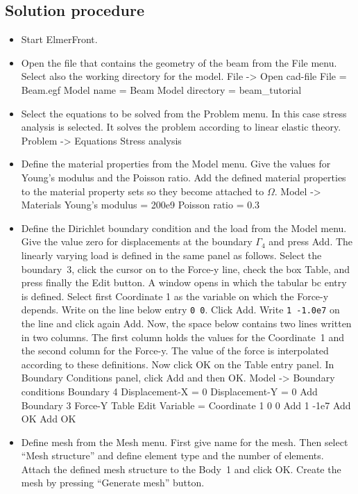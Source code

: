 \subsection*{Solution procedure}

\begin{itemize}
\item Start ElmerFront.
\item Open the file that contains the geometry of the beam from 
the File menu. Select also the working directory for the model.
\ttbegin
File -> Open cad-file 
  File = Beam.egf 
  Model name = Beam 
  Model directory = beam_tutorial
\ttend
\item Select the equations to be solved from the Problem menu. In this 
case stress analysis is selected. It solves the problem according to 
linear elastic theory. 
\ttbegin
Problem -> Equations 
  Stress analysis 
\ttend
\item Define the material properties from the Model menu. Give the values for 
Young's modulus and the Poisson ratio. Add the defined material 
properties to the material property sets so they become attached 
to $\Omega$. 
\ttbegin
Model -> Materials 
  Young's modulus = 200e9 
  Poisson ratio = 0.3
\ttend

\item Define the Dirichlet boundary condition and the load from the
Model menu. Give the value zero for displacements at the boundary
$\Gamma_4$ and press Add. The linearly varying load is defined in the
same panel as follows.  Select the boundary~3, click the cursor on to
the Force-y line, check the box Table, and press finally the Edit
button. A window opens in which the tabular bc entry is
defined. Select first Coordinate 1 as the variable on which the
Force-y depends. Write on the line below entry {\tt 0 0}. Click
Add. Write {\tt 1 -1.0e7} on the line and click again Add. Now, the
space below contains two lines written in two columns. The first
column holds the values for the Coordinate~1 and the second column for
the Force-y. The value of the force is interpolated according to these
definitions. Now click OK on the Table entry panel. In Boundary
Conditions panel, click Add and then OK.
\ttbegin
Model -> Boundary conditions
Boundary 4
Displacement-X = 0
Displacement-Y = 0
Add
Boundary 3
Force-Y
Table
Edit
Variable = Coordinate 1
0 0
Add
1 -1e7
Add
OK
Add
OK
\ttend

\item Define mesh from the Mesh menu. First give name for the
mesh. Then select ``Mesh structure'' and define element type and the
number of elements. Attach the defined mesh structure to the Body~1
and click OK. Create the mesh by pressing ``Generate mesh'' button.


\end{itemize}
